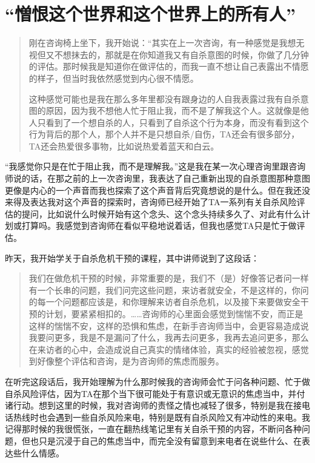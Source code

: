 \chapter{“憎恨这个世界和这个世界上的所有人”}



\blockquote{
    刚在咨询椅上坐下，我开始说：“其实在上一次咨询，有一种感觉是我想无视但又不想抹去的，那就是在你知道我又有自杀意图的时候，你做了几分钟的评估。那时候我是知道你在做评估的，而我一直不想让自己表露出不情愿的样子，但当时我依然感觉到内心很不情愿。
    
    这种感觉可能也是我在那么多年里都没有跟身边的人自我表露过我有自杀意图的原因，因为我不想他人忙于阻止我，而不是了解我这个人。这就像是他人只看到了一个想自杀的人，只看到了自杀这个行为本身，而没有看到这个行为背后的那个人，那个人并不是只想自杀/自伤，TA还会有很多部分，TA还会热爱很多事物，比如说热爱着蓝天和白云。
    
}

“我感觉你只是在忙于阻止我，而不是理解我。”这是我在某一次心理咨询里跟咨询师说的话，在那之前的上一次咨询里，我表达了自己重新出现的自杀意图\pozhehao{}那种意图更像是内心的一个声音\pozhehao{}而我也探索了这个声音背后究竟想说的是什么。但在我还没来得及表达我对这个声音的探索时，咨询师已经开始了TA一系列有关自杀风险评估的提问，比如说什么时候开始有这个念头、这个念头持续多久了、对此有什么计划或打算吗。我感觉到咨询师在看似平稳地说着话，但我也感觉TA只是忙于做评估。

昨天，我开始学关于自杀危机干预的课程，其中讲师说到了这段话：

\blockquote{
我们在做危机干预的时候，非常重要的是，我们不（是）好像答记者问一样有一个长串的问题，我们问完这些问题，来访者就安全，不是这样的，你问的每一个问题都应该是，和你理解来访者自杀危机，以及接下来要做安全干预的计划，要紧紧相扣的。……咨询师的心里面会感觉到惴惴不安，而正是这样的惴惴不安，这样的恐惧和焦虑，在新手咨询师当中，会更容易造成说我要问更多，我是不是漏问了什么，我再去问更多，我再去追问更多，那么在来访者的心中，会造成说自己真实的情绪体验，真实的经验被忽视，感觉到好像整个评估和咨询，是为咨询师的焦虑而服务。
}
在听完这段话后，我开始理解为什么那时候我的咨询师会忙于问各种问题、忙于做自杀风险评估，因为TA在那个当下很可能处于有意识或无意识的焦虑当中，并付诸行动。想到这里的时候，我对咨询师的责怪之情也减轻了很多，特别是我在接电话热线时也会遇到一些自杀风险来电，特别是既有自杀风险又有冲动性的来电。我记得那时候的我很慌张，一直在翻热线笔记里有关自杀干预的内容，不断问各种问题，但也只是沉浸于自己的焦虑当中，而完全没有留意到来电者在说些什么、在表达些什么情感。

